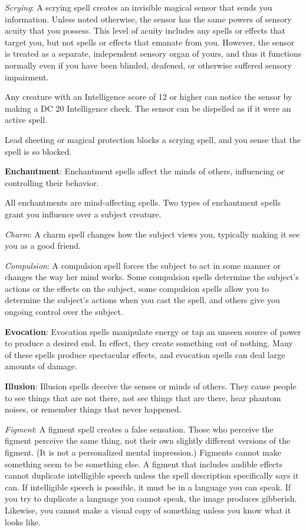 \textit{Scrying}: A scrying spell creates an invisible magical sensor that sends you information. Unless noted otherwise, the sensor has the same powers of sensory acuity that you possess. This level of acuity includes any spells or effects that target you, but not spells or effects that emanate from you. However, the sensor is treated as a separate, independent sensory organ of yours, and thus it functions normally even if you have been blinded, deafened, or otherwise suffered sensory impairment.

Any creature with an Intelligence score of 12 or higher can notice the sensor by making a DC 20 Intelligence check. The sensor can be dispelled as if it were an active spell.

Lead sheeting or magical protection blocks a scrying spell, and you sense that the spell is so blocked.

\textbf{Enchantment}: Enchantment spells affect the minds of others, influencing or controlling their behavior.

All enchantments are mind-affecting spells. Two types of enchantment spells grant you influence over a subject creature.

\textit{Charm}: A charm spell changes how the subject views you, typically making it see you as a good friend.

\textit{Compulsion}: A compulsion spell forces the subject to act in some manner or changes the way her mind works. Some compulsion spells determine the subject's actions or the effects on the subject, some compulsion spells allow you to determine the subject's actions when you cast the spell, and others give you ongoing control over the subject.

\textbf{Evocation}: Evocation spells manipulate energy or tap an unseen source of power to produce a desired end. In effect, they create something out of nothing. Many of these spells produce spectacular effects, and evocation spells can deal large amounts of damage.

\textbf{Illusion}: Illusion spells deceive the senses or minds of others. They cause people to see things that are not there, not see things that are there, hear phantom noises, or remember things that never happened.

\textit{Figment}: A figment spell creates a false sensation. Those who perceive the figment perceive the same thing, not their own slightly different versions of the figment. (It is not a personalized mental impression.) Figments cannot make something seem to be something else. A figment that includes audible effects cannot duplicate intelligible speech unless the spell description specifically says it can. If intelligible speech is possible, it must be in a language you can speak. If you try to duplicate a language you cannot speak, the image produces gibberish. Likewise, you cannot make a visual copy of something unless you know what it looks like.

